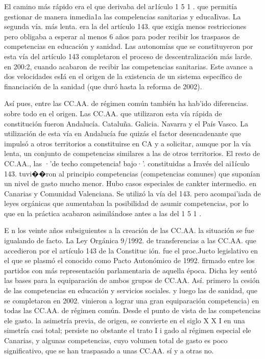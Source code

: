 \documentclass[10pt,a4paper]{article}
\begin{document}
El camino más rápido era el que derivaba del ar1ículo 1 5 1 . que permitía gestionar de manera inmedia1a las compelencias sanitarias y educaIivas. La segunda vía. más lenta. era la del artículo 143. que exigía menos restricciones pero obligaba a esperar al menos 6 años para poder recibir los traspasos de competencias en educación y sanidad. Las autonomías que se constituyeron por esta vía del artículo 143 completaron el proceso de descentralización más larde. en 200:2, cuando acabaron de recibir las competencias sanitarias. Este avance a dos velocidades esIá en el origen de la existencia de un sistema específico de financiación de la sanidad (que duró hasta la reforma de 2002).

Así pues, entre las CC.AA. de régimen común también ha hab'ido diferencias. sobre todo en el origen. Las CC.AA. que utilizaron esta vía rápida de constitución fueron Andalucía. Cataluña. Galicia. Navarra y el País Vasco. La utilización de esta vía en Andalucía fue quizás el factor desencadenante que impulsó a otros territorios a constituirse en CA y a solicitar, aunque por la vía lenta, un conjunto de competencias similares a las de otros territorios. El resto de CC.AA., las ·'de techo competencia! bajo·'. constituidas a Iravés del ai1ículo 143. tuvi��ron al principio competencias (competencias comunes) que suponían un nivel de gasto mucho menor. Hubo casos especiales de cankter intermedio. en Canarias y Comunidad Valenciana. Se utilizó la vía del 143. pero acompai'iada de leyes orgánicas que aumentaban la posibilidad de asumir competencias, por lo que en la práctica acabaron asimilándose antes a las del 1 5 1 .

E n los veinte años subsiguientes a la creación de las CC.AA. la situación se fue igualando de facto. La Ley Orgánica 9/1992. de transferencias a las CC.AA. que accedieron por el artículo 143 de la Constituc ión. fue el proc.Jucto legislativo en el que se plasmó el conocido como Pacto Autonómico de 1992. firmado entre los partidos con más representación parlamentaria de aquella época. Dicha ley sentó las bases para la equiparación de ambos grupos de CC.AA. Así. primero  la cesión de las competencias en educación y servicios sociales. y luego las de sanidad, que se completaron en 2002. vinieron a lograr una gran equiparación competencia) en todas las CC.AA. de régimen común. Desde el punto de vista de las competencias ele gasto. la asimetría previa, de origen, se convierte en el siglo X X I en una simetría casi total; persiste no obstante el trato I i gado al régimen especial ele Canarias, y algunas competencias, cuyo volumen total de gasto es poco significativo, que se han traspasado a unas CC.AA. sí y a otras no.
\end{document}
